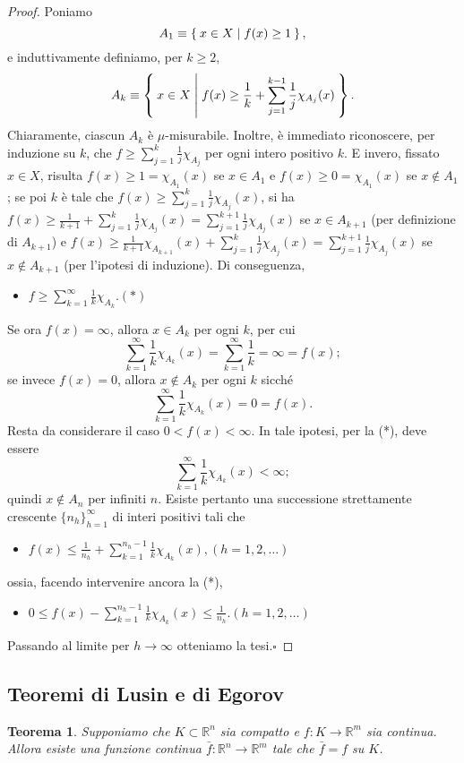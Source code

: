\documentclass[a4paper,10pt,openright,oneside]{book}
\theoremstyle{theoremstyle}
\newtheorem{teorema}{Teorema}[section]
\theoremstyle{theoremstylewoheader}
\theoremstyle{theoremstyle}
\theoremstyle{proofsecstyle}
\theoremstyle{nonumberplain}
\newtheorem{proof}{Dim.}
\newcommand{\RR}{\ensuremath{\mathbb{R}}}
\renewcommand{\qedsymbol}{\ensuremath{\square}}
\newcommand{\qed}{\unskip\nobreak\hfill\nobreak\hspace{.5em}\qedsymbol}
\newcommand{\mymath}[2]{\begin{itemize}%
  \item[]\hfill\hbox{}\ensuremath{\displaystyle #1}\hfill\ensuremath{\displaystyle #2}%
  \end{itemize}}
\begin{document}
\begin{proof}
Poniamo 
\[
A_1 \equiv \Set{ x \in X | f(x) \ge 1 },
\]
e induttivamente definiamo, per $k \ge 2$,
\[
A_k \equiv \Set{ x \in X | f(x) \ge \frac{1}{k} + \sum_{j=1}^{k-1} \frac{1}{j} \chi_{A_j}(x) }.
\]
Chiaramente, ciascun $A_k$ è $\mu$-misurabile. Inoltre, è immediato riconoscere, per induzione su $k$, che $f \ge \sum_{j=1}^k \frac{1}{j}\chi_{A_j}$ per ogni intero positivo $k$. E invero, fissato $x \in X$, risulta $f(x) \ge 1 = \chi_{A_1}(x)$ se $x \in A_1$ e $f(x) \ge 0 = \chi_{A_1}(x)$ se $x \notin A_1$; se poi $k$ è tale che $f(x) \ge \sum_{j=1}^k \frac{1}{j}\chi_{A_j}(x)$, si ha $f(x) \ge \frac{1}{k+1} + \sum_{j=1}^k \frac{1}{j} \chi_{A_j}(x) = \sum_{j=1}^{k+1} \frac{1}{j} \chi_{A_j}(x)$ se $x \in A_{k+1}$ (per definizione di $A_{k+1}$) e $f(x) \ge \frac{1}{k+1}\chi_{A_{k+1}}(x) + \sum_{j=1}^k \frac{1}{j}\chi_{A_j}(x) = \sum_{j=1}^{k+1} \frac{1}{j}\chi_{A_j}(x)$ se $x \notin A_{k+1}$ (per l'ipotesi di induzione). Di conseguenza, \mymath{f \ge \sum_{k=1}^\infty \frac{1}{k} \chi_{A_k}.}{(*)} Se ora $f(x) = \infty$, allora $x \in A_k$ per ogni $k$, per cui
\[
\sum_{k=1}^\infty \frac{1}{k} \chi_{A_k}(x) = \sum_{k=1}^\infty \frac{1}{k} = \infty = f(x);
\]
se invece $f(x) = 0$, allora $x \notin A_k$ per ogni $k$ sicché
\[
\sum_{k=1}^\infty \frac{1}{k} \chi_{A_k}(x) = 0 = f(x).
\]
Resta da considerare il caso $0 < f(x) < \infty$. In tale ipotesi, per la (*), deve essere
\[
\sum_{k=1}^\infty \frac{1}{k} \chi_{A_k}(x) < \infty;
\]
quindi $x \notin A_n$ per infiniti $n$. Esiste pertanto una successione strettamente crescente $\{n_h\}_{h=1}^\infty$ di interi positivi tali che \mymath{f(x) \le \frac{1}{n_h} + \sum_{k=1}^{n_h-1} \frac{1}{k} \chi_{A_k}(x),}{(h = 1, 2, \ldots)} ossia, facendo intervenire ancora la (*), \mymath{0 \le f(x) - \sum_{k=1}^{n_h-1} \frac{1}{k} \chi_{A_k}(x) \le \frac{1}{n_h}.}{(h = 1, 2, \ldots)} Passando al limite per $h \to \infty$ otteniamo la tesi.\qed
\end{proof}

\subsection{Teoremi di Lusin e di Egorov}

\begin{teorema}
\label{thm:estensione_funzioni_continue}
Supponiamo che $K \subset \RR^n$ sia compatto e $f : K \rightarrow \RR^m$ sia continua. Allora esiste una funzione continua $\bar{f} : \RR^n \rightarrow \RR^m$ tale che $\bar{f} = f$ su $K$.
\end{teorema}
\end{document}
